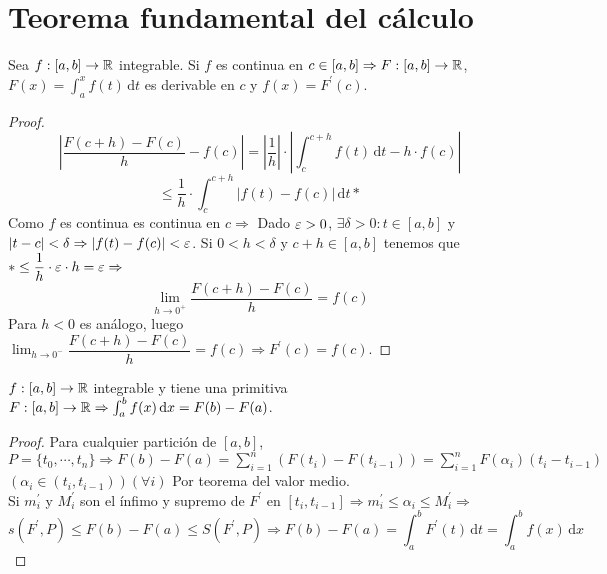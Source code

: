 \section{Teorema fundamental del cálculo}

\begin{theorem}
  Sea $f: [a, b] \to \mathbb{R}$ integrable. Si $f$ es continua en $c \in [a, b] \Rightarrow F: [a, b] \to \mathbb{R}$, $F(x) = \int_a^x f(t)\, \mathrm{d}t$ es derivable en $c$ y $f(x) = F^{\prime}(c)$.
  \begin{proof}
    \begin{equation}
      | \dfrac{F(c+h) - F(c)}{h} - f(c) | = |\dfrac{1}{h}| \cdot | \int_c^{c+h} f(t)\, \mathrm{d}t - h \cdot f(c) |
    \end{equation}
    \begin{equation}
      \leq \dfrac{1}{h} \cdot \int_c^{c+h}| f(t) - f(c) | \, \mathrm{d}t *
    \end{equation}
    Como $f$ es continua es continua en $c \Rightarrow$ Dado $\varepsilon > 0$, $\exists \delta > 0 : t \in [a, b]$ y $|t-c| < \delta \Rightarrow |f(t) - f(c)| < \varepsilon$.
    Si $0 < h < \delta$ y $c+h \in [a, b]$ tenemos que $* \leq \dfrac{1}{h} \cdot \varepsilon \cdot h = \varepsilon \Rightarrow$ \begin{equation}
      \lim_{h \to 0^+} \dfrac{F(c+h) - F(c)}{h} = f(c)
    \end{equation}
    Para $h < 0$ es análogo, luego $\lim_{h \to 0^-} \dfrac{F(c+h) - F(c)}{h} = f(c) \Rightarrow F^{\prime}(c) = f(c)$.
  \end{proof}
\end{theorem}

\begin{corollary}
  $f: [a, b] \to \mathbb{R}$ integrable y tiene una primitiva $F: [a, b] \to \mathbb{R} \Rightarrow \int_a^b f(x) \, \mathrm{d}x = F(b) - F(a)$.
  \begin{proof}
    Para cualquier partición de $[a, b]$, $P = \{ t_0, \cdots, t_n \} \Rightarrow F(b) - F(a) = \sum_{i = 1}^n (F(t_i) - F(t_{i-1})) = \sum_{i = 1}^n F(\alpha_i) (t_i - t_{i-1})$ $(\alpha_i \in (t_i, t_{i-1}))(\forall i)$ Por teorema del valor medio. \\
    Si $m_i^{\prime}$ y $M_i^{\prime}$ son el ínfimo y supremo de $F^{\prime}$ en $[t_i, t_{i-1}] \Rightarrow m_i^{\prime} \leq \alpha_i \leq M_i^{\prime} \Rightarrow$\
    \begin{equation}
      s(F^{\prime}, P) \leq F(b) - F(a) \leq S(F^{\prime}, P) \Rightarrow F(b) - F(a) = \int_a^b F^{\prime}(t) \, \mathrm{d}t = \int_a^b f(x) \, \mathrm{d}x
    \end{equation}
  \end{proof}
\end{corollary}

